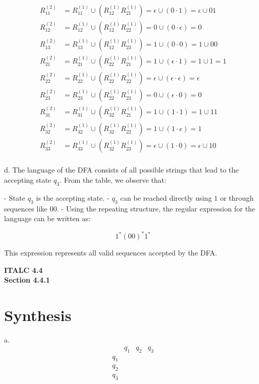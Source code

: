 \documentclass{article}
\theoremstyle{theorem}
\theoremstyle{definition}
\theoremstyle{remark}
\begin{document}
\[
\begin{aligned}
R_{11}^{(2)} &= R_{11}^{(1)} \cup (R_{12}^{(1)} R_{21}^{(1)}) = \epsilon \cup (0 \cdot 1) = \epsilon \cup 01 \\
R_{12}^{(2)} &= R_{12}^{(1)} \cup (R_{12}^{(1)} R_{22}^{(1)}) = 0 \cup (0 \cdot \epsilon) = 0 \\
R_{13}^{(2)} &= R_{13}^{(1)} \cup (R_{12}^{(1)} R_{23}^{(1)}) = 1 \cup (0 \cdot 0) = 1 \cup 00 \\
R_{21}^{(2)} &= R_{21}^{(1)} \cup (R_{22}^{(1)} R_{21}^{(1)}) = 1 \cup (\epsilon \cdot 1) = 1 \cup 1 = 1 \\
R_{22}^{(2)} &= R_{22}^{(1)} \cup (R_{22}^{(1)} R_{22}^{(1)}) = \epsilon \cup (\epsilon \cdot \epsilon) = \epsilon \\
R_{23}^{(2)} &= R_{23}^{(1)} \cup (R_{22}^{(1)} R_{23}^{(1)}) = 0 \cup (\epsilon \cdot 0) = 0 \\
R_{31}^{(2)} &= R_{31}^{(1)} \cup (R_{32}^{(1)} R_{21}^{(1)}) = 1 \cup (1 \cdot 1) = 1 \cup 11 \\
R_{32}^{(2)} &= R_{32}^{(1)} \cup (R_{32}^{(1)} R_{22}^{(1)}) = 1 \cup (1 \cdot \epsilon) = 1 \\
R_{33}^{(2)} &= R_{33}^{(1)} \cup (R_{32}^{(1)} R_{23}^{(1)}) = \epsilon \cup (1 \cdot 0) = \epsilon \cup 10 \\
\end{aligned}
\]

d. The language of the DFA consists of all possible strings that lead to the accepting state \( q_3 \). From the table, we observe that:

- State \( q_3 \) is the accepting state.
- \( q_3 \) can be reached directly using \( 1 \) or through sequences like \( 00 \).
- Using the repeating structure, the regular expression for the language can be written as:

\[
1^* (00)^* 1^*
\]

This expression represents all valid sequences accepted by the DFA.

\textbf{ITALC 4.4} \\
\textbf{Section 4.4.1} \\
\section{Synthesis}
a. 
\[
\begin{array}{c|ccccc}
    & q_1 & q_2 & q_3 \\
\hline
q_1 &     &     &     \\
q_2 &     &     &     \\
q_3 &     &     &     \\
\end{array}
\]
\end{document}
